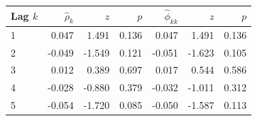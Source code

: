 \begin{tabular}{lrrrrrr}
\toprule
Lag $k$ & $\hat\rho_k$ & $z$ & $p$ & $\hat\phi_{kk}$ & $z$  & $p$  \\
\midrule
1 & 0.047 & 1.491 & 0.136 & 0.047 & 1.491 & 0.136 \\
2 & -0.049 & -1.549 & 0.121 & -0.051 & -1.623 & 0.105 \\
3 & 0.012 & 0.389 & 0.697 & 0.017 & 0.544 & 0.586 \\
4 & -0.028 & -0.880 & 0.379 & -0.032 & -1.011 & 0.312 \\
5 & -0.054 & -1.720 & 0.085 & -0.050 & -1.587 & 0.113 \\
\bottomrule
\end{tabular}
